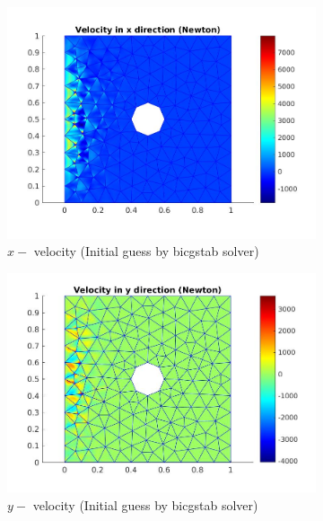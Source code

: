 \documentclass[a4paper]{book}
\begin{document}
\begin{figure}
\begin{subfigure}{0.5\textwidth}	
  \includegraphics[width=\linewidth]{cylinder_newton_vx_bicgstab.jpg}
  \caption{$x-$ velocity (Initial guess by bicgstab solver)}
  \label{x_vel_navier_stoke_bicgstab}
\end{subfigure}
\begin{subfigure}{0.5\textwidth}	
  \includegraphics[width=\linewidth]{cylinder_newton_vy_bicgstab.jpg}
  \caption{$y-$ velocity (Initial guess by bicgstab solver)}
  \label{y_vel_navier_stoke_bicgstab}
\end{subfigure}
\begin{subfigure}{\textwidth}	

\end{subfigure}
\end{figure}
\end{document}
